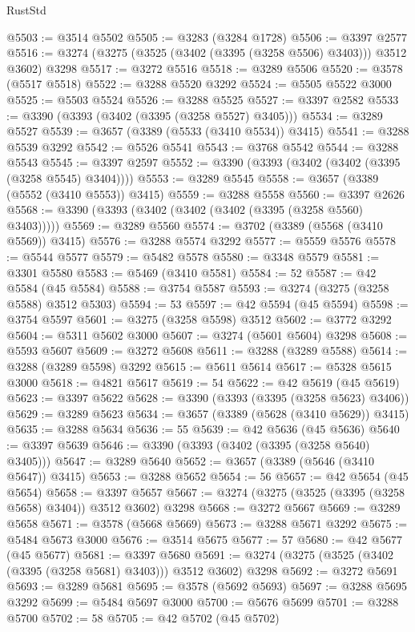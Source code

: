 \begin{lexlean}{RustStd}
\begin{coremodule}
@5503 := @3514 @5502
@5505 := @3283 (@3284 @1728)
@5506 := @3397 @2577
@5516 := @3274 (@3275 (@3525 (@3402 (@3395 (@3258 @5506) @3403))) @3512 @3602) @3298
@5517 := @3272 @5516
@5518 := @3289 @5506
@5520 := @3578 (@5517 @5518)
@5522 := @3288 @5520 @3292
@5524 := @5505 @5522 @3000
@5525 := @5503 @5524
@5526 := @3288 @5525
@5527 := @3397 @2582
@5533 := @3390 (@3393 (@3402 (@3395 (@3258 @5527) @3405)))
@5534 := @3289 @5527
@5539 := @3657 (@3389 (@5533 (@3410 @5534)) @3415)
@5541 := @3288 @5539 @3292
@5542 := @5526 @5541
@5543 := @3768 @5542
@5544 := @3288 @5543
@5545 := @3397 @2597
@5552 := @3390 (@3393 (@3402 (@3402 (@3395 (@3258 @5545) @3404))))
@5553 := @3289 @5545
@5558 := @3657 (@3389 (@5552 (@3410 @5553)) @3415)
@5559 := @3288 @5558
@5560 := @3397 @2626
@5568 := @3390 (@3393 (@3402 (@3402 (@3402 (@3395 (@3258 @5560) @3403)))))
@5569 := @3289 @5560
@5574 := @3702 (@3389 (@5568 (@3410 @5569)) @3415)
@5576 := @3288 @5574 @3292
@5577 := @5559 @5576
@5578 := @5544 @5577
@5579 := @5482 @5578
@5580 := @3348 @5579
@5581 := @3301 @5580
@5583 := @5469 (@3410 @5581)
@5584 := 52
@5587 := @42 @5584 (@45 @5584)
@5588 := @3754 @5587
@5593 := @3274 (@3275 (@3258 @5588) @3512 @5303)
@5594 := 53
@5597 := @42 @5594 (@45 @5594)
@5598 := @3754 @5597
@5601 := @3275 (@3258 @5598) @3512
@5602 := @3772 @3292
@5604 := @5311 @5602 @3000
@5607 := @3274 (@5601 @5604) @3298
@5608 := @5593 @5607
@5609 := @3272 @5608
@5611 := @3288 (@3289 @5588)
@5614 := @3288 (@3289 @5598) @3292
@5615 := @5611 @5614
@5617 := @5328 @5615 @3000
@5618 := @4821 @5617
@5619 := 54
@5622 := @42 @5619 (@45 @5619)
@5623 := @3397 @5622
@5628 := @3390 (@3393 (@3395 (@3258 @5623) @3406))
@5629 := @3289 @5623
@5634 := @3657 (@3389 (@5628 (@3410 @5629)) @3415)
@5635 := @3288 @5634
@5636 := 55
@5639 := @42 @5636 (@45 @5636)
@5640 := @3397 @5639
@5646 := @3390 (@3393 (@3402 (@3395 (@3258 @5640) @3405)))
@5647 := @3289 @5640
@5652 := @3657 (@3389 (@5646 (@3410 @5647)) @3415)
@5653 := @3288 @5652
@5654 := 56
@5657 := @42 @5654 (@45 @5654)
@5658 := @3397 @5657
@5667 := @3274 (@3275 (@3525 (@3395 (@3258 @5658) @3404)) @3512 @3602) @3298
@5668 := @3272 @5667
@5669 := @3289 @5658
@5671 := @3578 (@5668 @5669)
@5673 := @3288 @5671 @3292
@5675 := @5484 @5673 @3000
@5676 := @3514 @5675
@5677 := 57
@5680 := @42 @5677 (@45 @5677)
@5681 := @3397 @5680
@5691 := @3274 (@3275 (@3525 (@3402 (@3395 (@3258 @5681) @3403))) @3512 @3602) @3298
@5692 := @3272 @5691
@5693 := @3289 @5681
@5695 := @3578 (@5692 @5693)
@5697 := @3288 @5695 @3292
@5699 := @5484 @5697 @3000
@5700 := @5676 @5699
@5701 := @3288 @5700
@5702 := 58
@5705 := @42 @5702 (@45 @5702)

\end{coremodule}
\end{lexlean}
